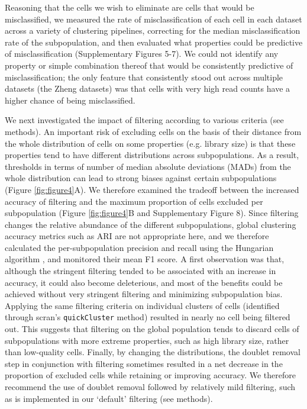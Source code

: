 \documentclass{bmcart}
\begin{document}
Reasoning that the cells we wish to eliminate are cells that would be misclassified, we measured the rate of misclassification of each cell in each dataset across a variety of clustering pipelines, correcting for the median misclassification rate of the subpopulation, and then evaluated what properties could be predictive of misclassification (Supplementary Figures 5-7). We could not identify any property or simple combination thereof that would be consistently predictive of misclassification; the only feature that consistently stood out across multiple datasets (the Zheng datasets) was that cells with very high read counts have a higher chance of being misclassified.

We next investigated the impact of filtering according to various criteria (see methods). An important risk of excluding cells on the basis of their distance from the whole distribution of cells on some properties (e.g. library size) is that these properties tend to have different distributions across subpopulations. As a result, thresholds in terms of number of median absolute deviations (MADs) from the whole distribution can lead to strong biases against certain subpopulations (Figure \ref{fig:figure4}A). We therefore examined the tradeoff between the increased accuracy of filtering and the maximum proportion of cells excluded per subpopulation (Figure \ref{fig:figure4}B and Supplementary Figure 8). Since filtering changes the relative abundance of the different subpopulations, global clustering accuracy metrics such as ARI are not appropriate here, and we therefore calculated the per-subpopulation precision and recall using the Hungarian algorithm \citep{PapadimitriouHu1998}, and monitored their mean F1 score. A first observation was that, although the stringent filtering tended to be associated with an increase in accuracy, it could also become deleterious, and most of the benefits could be achieved without very stringent filtering and minimizing subpopulation bias. Applying the same filtering criteria on individual clusters of cells (identified through scran's \texttt{quickCluster} method) resulted in nearly no cell being filtered out. This suggests that filtering on the global population tends to discard cells of subpopulations with more extreme properties, such as high library size, rather than low-quality cells. Finally, by changing the distributions, the doublet removal step in conjunction with filtering sometimes resulted in a net decrease in the proportion of excluded cells while retaining or improving accuracy. We therefore recommend the use of doublet removal followed by relatively mild filtering, such as is implemented in our `default' filtering (see methods).
\end{document}

